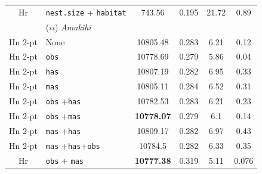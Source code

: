 \documentclass[useAMS,referee]{biom}
\begin{document}
\begin{table}
\begin{tabular}{c l c c c c}
Hr & \texttt{nest.size} + \texttt{habitat} & 743.56 & 0.195  & 21.72 & 0.89\\ %
 & ($ii$) \textit{Amakihi} & & & & \\
Hn 2-pt  &  None  &  10805.48  &  0.283  &  6.21  &  0.12 \\
Hn 2-pt  & \texttt{obs} &  10778.69  &  0.279  &  5.86  &  0.04 \\
Hn 2-pt  &  \texttt{has}  &  10807.19  &  0.282  &  6.95  &  0.33 \\
Hn 2-pt  &  \texttt{mas}  &  10805.11  &  0.284  &  6.52  &  0.31 \\
Hn 2-pt  &  \texttt{obs} +\texttt{has}  &  10782.53  &  0.283  &  6.21  &  0.23 \\
Hn 2-pt  &  \texttt{obs} +\texttt{mas}  &  \textbf{10778.07}  &  0.279  &  6.1  &  0.14 \\
Hn 2-pt  &  \texttt{mas} +\texttt{has}  &  10809.17  &  0.282  &  6.97  &  0.43 \\
Hn 2-pt  &  \texttt{mas} +\texttt{has}+\texttt{obs}  &  10784.5  &  0.282  &  6.33  &  0.35 \\
Hr & \texttt{obs} + \texttt{mas} & \textbf{10777.38} &  0.319 & 5.11 & 0.076\\ %
\hline
\hline
\end{tabular}
\label{big-results-table}
\end{table}
\end{document}
